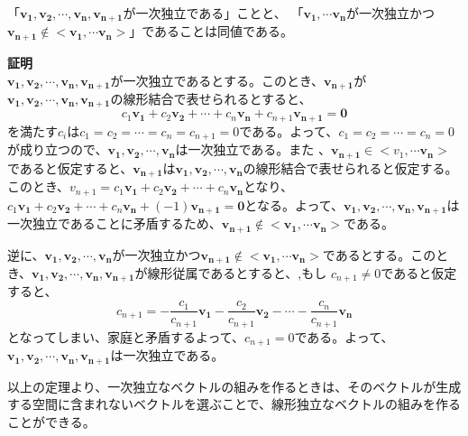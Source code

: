 \documentclass{jlreq}
\begin{document}
\begin{theorembox}[定理2]
  「$\boldsymbol{v_1}, \boldsymbol{v_2}, \cdots, \boldsymbol{v_n}, \boldsymbol{v_{n+1}}$が一次独立である」ことと、
  「$\boldsymbol{v_1}, \cdots \boldsymbol{v_n}$が一次独立かつ$\boldsymbol{v_{n + 1}} \notin <\boldsymbol{v_1, \cdots \boldsymbol{v_n}}>$」であることは同値である。

  \dotfill

  \textbf{証明} \\
  $\boldsymbol{v_1}, \boldsymbol{v_2}, \cdots, \boldsymbol{v_n}, \boldsymbol{v_{n + 1}}$が一次独立であるとする。このとき、$\boldsymbol{v_{n+1}}$が$\boldsymbol{v_1}, \boldsymbol{v_2}, \cdots, \boldsymbol{v_n}, \boldsymbol{v_{n + 1}}$の線形結合で表せられるとすると、
  \begin{equation*}
    c_1 \boldsymbol{v_1} + c_2 \boldsymbol{v_2} + \cdots + c_n \boldsymbol{v_n} + c_{n+1} \boldsymbol{v_{n + 1}} = \boldsymbol{0}
  \end{equation*}
  を満たす$c_i$は$c_1 = c_2 = \cdots = c_n = c_{n + 1} = 0$である。よって、$c_1 = c_2 = \cdots = c_n = 0$が成り立つので、$\boldsymbol{v_1}, \boldsymbol{v_2}, \cdots, \boldsymbol{v_n}$は一次独立である。また
  、$\boldsymbol{v_{n + 1}} \in <v_1, \cdots \boldsymbol{v_n>}$であると仮定すると、$\boldsymbol{v_{n + 1}}$は$\boldsymbol{v_1}, \boldsymbol{v_2}, \cdots, \boldsymbol{v_n}$の線形結合で表せられると仮定する。このとき、$v_{n +1} = c_1 \boldsymbol{v_1} + c_2 \boldsymbol{v_2} + \cdots + c_n \boldsymbol{v_n}$となり、
  $c_1 \boldsymbol{v_1} + c_2 \boldsymbol{v_2} + \cdots + c_n \boldsymbol{v_n} + (-1) \boldsymbol{v_{n + 1}} = \boldsymbol{0}$となる。よって、$\boldsymbol{v_1}, \boldsymbol{v_2}, \cdots, \boldsymbol{v_n}, \boldsymbol{v_{n + 1}}$は一次独立であることに矛盾するため、$\boldsymbol{v_{n + 1}} \notin <\boldsymbol{v_1}, \cdots \boldsymbol{v_n}>$である。

  逆に、$\boldsymbol{v_1}, \boldsymbol{v_2}, \cdots, \boldsymbol{v_n}$が一次独立かつ$\boldsymbol{v_{n + 1}} \notin <\boldsymbol{v_1, \cdots \boldsymbol{v_n}}>$であるとする。このとき、$\boldsymbol{v_1}, \boldsymbol{v_2}, \cdots, \boldsymbol{v_n}, \boldsymbol{v_{n + 1}}$が線形従属であるとすると、,もし
  $c_{n + 1} \neq 0$であると仮定すると、
  \begin{equation*}
    c_{n + 1} = - \frac{c_1}{c_{n + 1}} \boldsymbol{v_1} - \frac{c_2}{c_{n + 1}} \boldsymbol{v_2} - \cdots - \frac{c_n}{c_{n + 1}} \boldsymbol{v_n}
  \end{equation*}
  となってしまい、家庭と矛盾するよって、$c_{n + 1} = 0$である。よって、$\boldsymbol{v_1}, \boldsymbol{v_2}, \cdots, \boldsymbol{v_n}, \boldsymbol{v_{n + 1}}$は一次独立である。
\end{theorembox}
以上の定理より、一次独立なベクトルの組みを作るときは、そのベクトルが生成する空間に含まれないベクトルを選ぶことで、線形独立なベクトルの組みを作ることができる。
\end{document}
